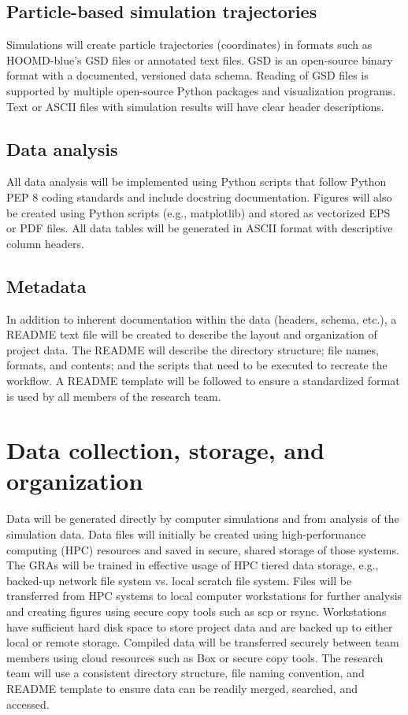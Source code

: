 \documentclass{article}
\begin{document}
\subsection{Particle-based simulation trajectories}
Simulations will create particle trajectories
(coordinates) in formats such as HOOMD-blue’s GSD files or annotated text files. GSD is an
open-source binary format with a documented, versioned data schema. Reading of GSD files is
supported by multiple open-source Python packages and visualization programs. Text or ASCII files with 
simulation results will have clear header descriptions. 
\subsection{Data analysis}
 All data analysis will be implemented using Python scripts that follow Python
PEP 8 coding standards and include docstring documentation. Figures will also be created using
Python scripts (e.g., matplotlib) and stored as vectorized EPS or PDF files. All data tables will be
generated in ASCII format with descriptive column headers.

\subsection{ Metadata}
 In addition to inherent documentation within the data (headers, schema, etc.), a
README text file will be created to describe the layout and organization of project data. The
README will describe the directory structure; file names, formats, and contents; and the scripts
that need to be executed to recreate the workflow. A README template will be followed to ensure
a standardized format is used by all members of the research team.

\section{Data collection, storage, and organization}
Data will be generated directly by computer simulations and from analysis of the simulation data.
Data files will initially be created using high-performance computing (HPC) resources and saved
in secure, shared storage of those systems. The GRAs will be trained in effective usage of HPC
tiered data storage, e.g., backed-up network file system vs. local scratch file system. Files will be
transferred from HPC systems to local computer workstations for further analysis and creating
figures using secure copy tools such as scp or rsync. Workstations have sufficient hard disk space
to store project data and are backed up to either local or remote storage. Compiled data will be
transferred securely between team members using cloud resources such as Box or secure copy
tools. The research team will use a consistent directory structure, file naming convention, and
README template to ensure data can be readily merged, searched, and accessed.
\end{document}
